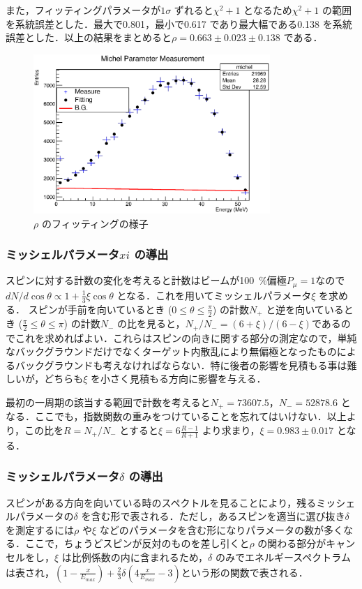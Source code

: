 また，フィッティングパラメータが$1\sigma$ ずれると$\chi^{2}+1$ となるため$\chi^{2} + 1$ の範囲を系統誤差とした．最大で0.801，最小で0.617 であり最大幅である0.138 を系統誤差とした．以上の結果をまとめると$\rho=0.663 \pm 0.023 \pm 0.138$ である．

\begin{figure}[hbt]
\centering
\includegraphics[width=0.8\textwidth]{figure/hatano/rho.eps}
\caption{$\rho$ のフィッティングの様子}
\label{hatano_fig:rho}
\end{figure}

\subsubsection{ミッシェルパラメータ$xi$ の導出}
スピンに対する計数の変化を考えると計数はビームが100~\%偏極$P_{\mu} = 1$なので$dN / d \cos \theta \propto 1 + \frac{1}{3} \xi \cos \theta$ となる．これを用いてミッシェルパラメータ$\xi$ を求める．
スピンが手前を向いているとき ($0\leq\theta\leq\frac{\pi}{2}$) の計数$N_+$ と逆を向いているとき ($\frac{\pi}{2}\leq\theta\leq\pi$) の計数$N_-$ の比を見ると，$N_{+} / N_{-} =  (6 + \xi) / (6 -\xi)$であるのでこれを求めればよい．これらはスピンの向きに関する部分の測定なので，単純なバックグラウンドだけでなくターゲット内散乱により無偏極となったものによるバックグラウンドも考えなければならない．特に後者の影響を見積もる事は難しいが，どちらも$\xi$ を小さく見積もる方向に影響を与える．

最初の一周期の該当する範囲で計数を考えると$N_+=73607.5$，$N_-=52878.6$ となる．ここでも，指数関数の重みをつけていることを忘れてはいけない．以上より，この比を$R=N_{+} / N_{-}$ とすると$\xi=6\frac{R-1}{R+1}$ より求まり，$\xi=0.983\pm0.017$ となる．

\subsubsection{ミッシェルパラメータ$\delta$ の導出}
スピンがある方向を向いている時のスペクトルを見ることにより，残るミッシェルパラメータの$\delta$ を含む形で表される．ただし，あるスピンを適当に選び抜き$\delta$ を測定するには$\rho$ や$\xi$ などのパラメータを含む形になりパラメータの数が多くなる．ここで，ちょうどスピンが反対のものを差し引くと$\rho$ の関わる部分がキャンセルをし，$\xi$ は比例係数の内に含まれるため，$\delta$ のみでエネルギースペクトラムは表され，$(1-\frac{x}{E_{max}})+\frac{2}{3}\delta(4\frac{x}{E_{max}}-3)$という形の関数で表される．

